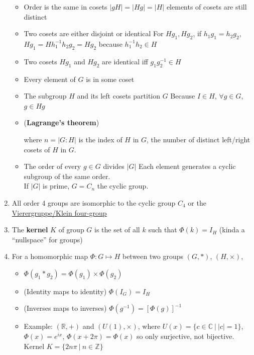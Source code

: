 \documentclass{article}
\theoremstyle{remark}
\theoremstyle{remark}
\newcommand{\where}[1]{\begin{flushright}where #1.\end{flushright}}
\begin{document}
\begin{enumerate}
\begin{itemize}
                \item Order is the same in cosets $|gH|=|Hg|=|H|$ \newline
                        elements of cosets are still distinct
                \item Two cosets are either disjoint or identical \newline
                        For $Hg_1, Hg_2$, if $h_1g_1=h_2g_2$, $Hg_1=Hh_1^{-1}h_2g_2=Hg_2$ because $h_1^{-1}h_2\in H$
                \item Two cosets $Hg_1$ and $Hg_2$ are identical iff $g_1g^{-1}_2\in H$
                \item Every element of $G$ is in some coset
                \item The subgroup $H$ and its left cosets partition $G$\newline
                        Because $I\in H$, $\forall g\in G$, $g\in Hg$
                \item (\textbf{Lagrange's theorem}) 
                    \where{$n=|G:H|$ is the index of $H$ in $G$, \newline the number of distinct left/right cosets of $H$ in $G$}
                \item The order of every $g\in G$ divides $|G|$\newline
                        Each element generates a cyclic subgroup of the same order.\\
                        If $|G|$ is prime, $G=C_n$ the cyclic group.
            \end{itemize}
        \item All order 4 groups are isomorphic to the cyclic group $C_4$ or the \href{https://mathworld.wolfram.com/Vierergruppe.html}{Vierergruppe/Klein four-group}
        \item The \textbf{kernel} $K$ of group $G$ is the set of all $k$ such that $\Phi(k)=I_H$ (kinda a ``nullspace'' for groups)
        \item For a homomorphic map $\Phi:G\mapsto H$ between two groups $(G,*)$, $(H,\times)$,\begin{itemize}
            \item $\Phi(g_1*g_2)=\Phi(g_1)\times\Phi(g_2)$
            \item (Identity maps to identity) $\Phi(I_G)=I_H$
            \item (Inverses maps to inverses) $\Phi(g^{-1})=\left[\Phi(g)\right]^{-1}$
            \item Example: $(\mathbb{R},+)$ and $(U(1),\times)$, where $U(x)=\{c\in\mathbb{C}\ |\ |c|=1\}$, $\Phi(x)=e^{ix}$, $\Phi(x+2\pi)=\Phi(x)$ so only surjective, not bijective. Kernel $K=\{2n\pi\ |\ n\in\mathbb{Z}\}$

\end{itemize}
\end{enumerate}
\end{document}

